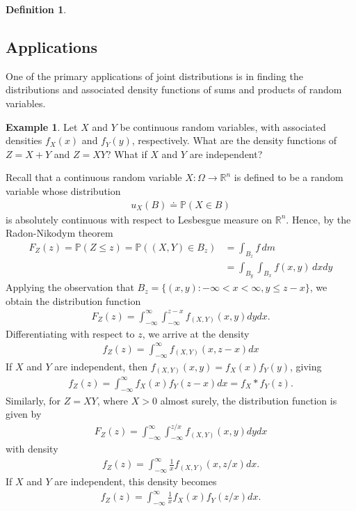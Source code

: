 \documentclass[12pt]{article}
\newcommand{\rr}{\mathbb{R}}
\newcommand{\prob}{\mathbb{P}}
\theoremstyle{plain}
\theoremstyle{definition}
\newtheorem*{definition}{Definition}
\newtheorem*{example}{Example}
\theoremstyle{remark}
\numberwithin{equation}{section}  %
\begin{document}
\begin{definition}
\subsection{Applications}
One of the primary applications of joint distributions is in finding the
distributions and associated density functions of sums and products of random
variables.
\begin{example}
Let $X$ and $Y$ be continuous random variables, with associated densities
$f_X(x)$ and $f_Y(y)$, respectively. What are the density functions of
$Z = X+Y$ and $Z = XY$? What if $X$ and $Y$ are independent?
\end{example}
Recall that a continuous random variable $X: \Omega \to \rr^n$
is defined to be a random variable whose distribution
\begin{align*}
u_X(B) \doteq \prob(X \in B)
\end{align*}
is absolutely continuous with respect to Lesbesgue measure on $\rr^n$. Hence, by
the Radon-Nikodym theorem
\begin{align*}
F_Z(z) = \prob(Z \le z) = \prob((X,Y) \in B_z) 
& = \int_{B_z} f \, dm
\\
& = \int_{B_y} \int_{B_x} f(x,y) \, dx dy
\end{align*}
Applying the observation that $B_z
= \{(x,y):
-\infty < x < \infty, y \le z-x \}$, we obtain the distribution function 
\begin{align*}
F_Z(z) = \int_{-\infty}^{\infty} \int_{-\infty}^{z-x} f_{(X,Y)}(x,y) dy dx.
\end{align*}
Differentiating with respect to $z$, we arrive
at the density
\begin{align*}
f_Z(z) = \int_{-\infty}^{\infty} f_{(X,Y)}(x,z-x) dx
\end{align*}
If $X$ and $Y$ are independent, then $f_{(X,Y)}(x, y) = f_X(x) f_Y(y)$, giving
\begin{align*}
f_Z(z) = \int_{-\infty}^{\infty} f_X(x) f_Y(z-x) dx = f_X * f_Y(z).
\end{align*}
Similarly, for $Z = XY$, where $X > 0$ almost surely,  the distribution
function is given by
\begin{align*}
F_Z(z) = \int_{-\infty}^{\infty} \int_{-\infty}^{z/x} f_{(X,Y)}(x,y) dy dx
\end{align*}
with density
\begin{align*}
f_Z(z) = \int_{-\infty}^{\infty} \frac{1}{x} f_{(X,Y)}(x,z/x) dx.
\end{align*}
If $X$ and $Y$ are independent, this density becomes
\begin{align*}
f_Z(z) = \int_{-\infty}^{\infty} \frac{1}{x} f_X(x) f_Y(z/x) dx.
\end{align*}

\end{definition}
\end{document}
